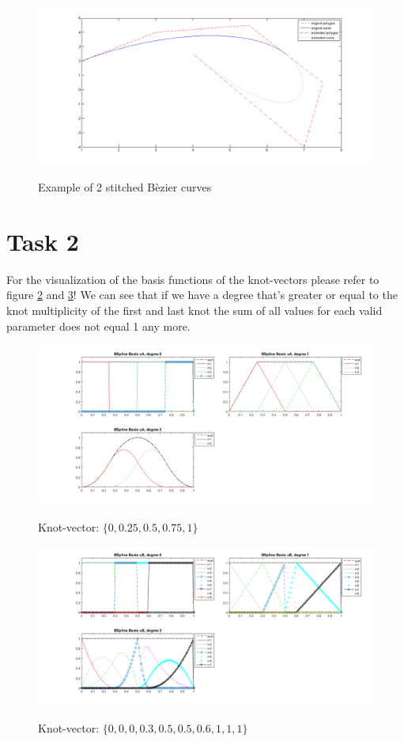 \documentclass[12pt,a4paper]{article}
\begin{document}
\begin{figure}[hbtp]
\caption{Example of 2 stitched Bèzier curves}
\centering
\includegraphics[width=\textwidth]{newBranch.png}
\label{fig:1}
\end{figure}

\section{Task 2}
For the visualization of the basis functions of the knot-vectors please refer to figure \ref{fig:2a} and \ref{fig:2b}! We can see that if we have a degree that's greater or equal to the knot multiplicity of the first and last knot the sum of all values for each valid parameter does not equal 1 any more.

\begin{figure}[hbtp]
\caption{Knot-vector: $\{0, 0.25, 0.5, 0.75, 1\}$}
\centering
\includegraphics[width=\textwidth]{basisFunctA.png}
\label{fig:2a}
\end{figure}

\begin{figure}[hbtp]
\caption{Knot-vector: $\{0, 0, 0, 0.3, 0.5, 0.5, 0.6, 1, 1, 1\}$}
\centering
\includegraphics[width=\textwidth]{basisFunctB.png}
\label{fig:2b}
\end{figure}
\end{document}
